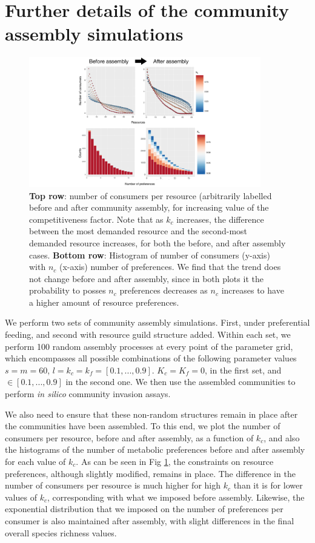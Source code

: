 \documentclass[12pt]{article}
\begin{document}
\section{Further details of the community assembly simulations}

\begin{figure}[t]
	\centering
	\includegraphics[width=0.9\textwidth]{before_after_assembly.pdf}
	\caption{\textbf{Top row}: number of consumers per resource (arbitrarily labelled before and after community assembly, for increasing value of the competitiveness factor. Note that as $k_c$ increases, the difference between the most demanded resource and the second-most demanded resource increases, for both the before, and after assembly cases. \textbf{Bottom row}: Histogram of number of consumers (y-axis) with $n_c$ (x-axis) number of preferences. We find that the trend does not change before and after assembly, since in both plots it the probability to posses $n_c$ preferences decreases as $n_c$ increases to have a higher amount of resource preferences.}
	\label{fig:before_after_assembly}
\end{figure}

We perform two sets of community assembly simulations. First, under preferential feeding, and second with resource guild structure added. Within each set, we perform 100 random assembly processes at every point of the parameter grid, which encompasses all possible combinations of the following parameter values $s = m = 60$, $l = k_c = k_f = [0.1,...,0.9]$. $K_c = K_f = 0$, in the first set, and $\in [0.1,...,0.9]$ in the second one. We then use the assembled communities to perform \textit{in silico} community invasion assays.

We also need to ensure that these non-random structures remain in place after the communities have been assembled. To this end, we plot the number of consumers per resource, before and after assembly, as a function of $k_c$, and also the histograms of the number of metabolic preferences before and after assembly for each value of $k_c$. As can be seen in Fig  \ref{fig:before_after_assembly}, the constraints on resource preferences, although slightly modified, remains in place. The difference in the number of consumers per resource is much higher for high $k_c$ than it is for lower values of $k_c$, corresponding with what we imposed before assembly. Likewise, the exponential distribution that we imposed on the number of preferences per consumer is also maintained after assembly, with slight differences in the final overall species richness values.
\end{document}
